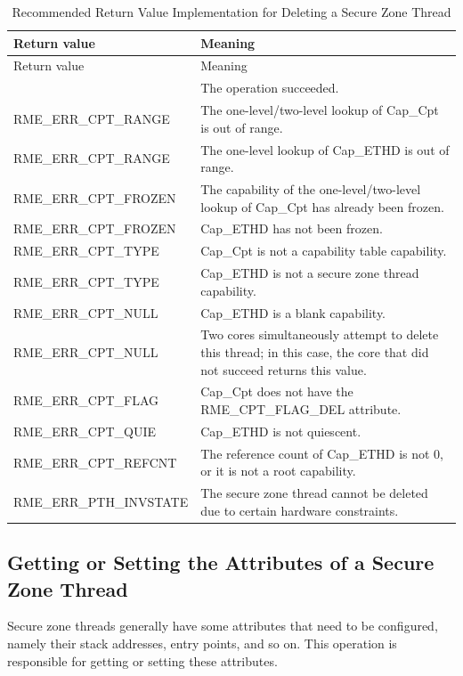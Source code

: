 \begin{xltabular}{\textwidth}{@{}>{\hsize\raggedright\arraybackslash}X>{\hsize\raggedright\arraybackslash}X@{}}
\caption{Recommended Return Value Implementation for Deleting a Secure Zone Thread}\label{tab:8-103-delete-enclave-thread-suggested-return-values}\\
\toprule
Return value & Meaning\tabularnewline
\endfirsthead
\toprule
Return value & Meaning\tabularnewline
\midrule
\endhead
\bottomrule
{} & The operation succeeded.\tabularnewline
    RME\_ERR\_CPT\_RANGE & The one-level/two-level lookup of Cap\_Cpt is out of range.\tabularnewline
    RME\_ERR\_CPT\_RANGE & The one-level lookup of Cap\_ETHD is out of range.\tabularnewline
    RME\_ERR\_CPT\_FROZEN & The capability of the one-level/two-level lookup of Cap\_Cpt has already been frozen.\tabularnewline
    RME\_ERR\_CPT\_FROZEN & Cap\_ETHD has not been frozen.\tabularnewline
    RME\_ERR\_CPT\_TYPE & Cap\_Cpt is not a capability table capability.\tabularnewline
    RME\_ERR\_CPT\_TYPE & Cap\_ETHD is not a secure zone thread capability.\tabularnewline
    RME\_ERR\_CPT\_NULL & Cap\_ETHD is a blank capability.\tabularnewline
    RME\_ERR\_CPT\_NULL & Two cores simultaneously attempt to delete this thread; in this case, the core that did not succeed returns this value.\tabularnewline
    RME\_ERR\_CPT\_FLAG & Cap\_Cpt does not have the RME\_CPT\_FLAG\_DEL attribute.\tabularnewline
    RME\_ERR\_CPT\_QUIE & Cap\_ETHD is not quiescent.\tabularnewline
    RME\_ERR\_CPT\_REFCNT & The reference count of Cap\_ETHD is not 0, or it is not a root capability.\tabularnewline
    RME\_ERR\_PTH\_INVSTATE & The secure zone thread cannot be deleted due to certain hardware constraints.\tabularnewline
\end{xltabular}
\nopagebreak[4]

\subsection{Getting or Setting the Attributes of a Secure Zone Thread}\label{subsec:8-get-or-set-enclave-thread-attributes}

Secure zone threads generally have some attributes that need to be configured, namely their stack addresses, entry points, and so on. This operation is responsible for getting or setting these attributes.

